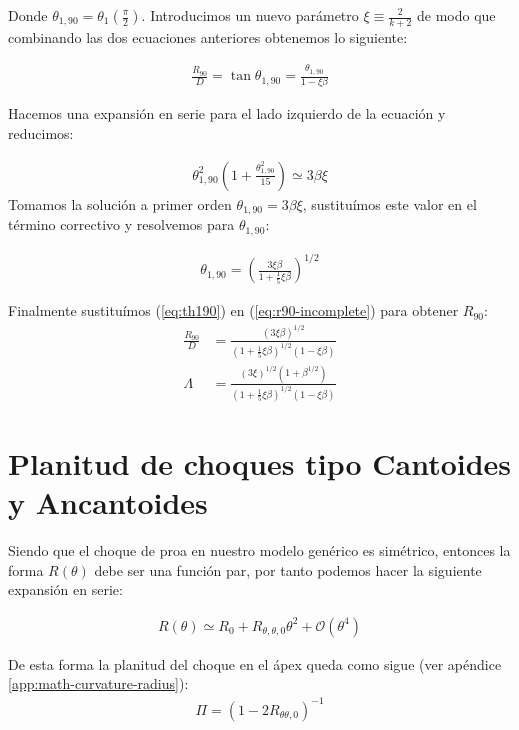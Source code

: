 Donde $\theta_{1,90} = \theta_1\left(\frac{\pi}{2}\right)$. Introducimos un nuevo parámetro $\xi \equiv \frac{2}{k+2}$ de modo que
combinando las dos ecuaciones anteriores obtenemos lo siguiente:

\begin{align}
  \frac{R_{90}}{D} = \tan\theta_{1,90} = \frac{\theta_{1,90}}{1-\xi\beta} \label{eq:r90-incomplete}
\end{align}

Hacemos una expansión en serie para el lado izquierdo de la ecuación y reducimos:

\begin{align}
  \theta^2_{1,90}\left(1 + \frac{\theta^2_{1,90}}{15}\right) \simeq 3\beta\xi
\end{align}
Tomamos la solución a primer orden $\theta_{1,90} = 3\beta\xi$,  sustituímos este valor en el término correctivo y resolvemos para
$\theta_{1,90}$:

\begin{align}
  \theta_{1,90} = \left(\frac{3\xi\beta}{1+\frac{1}{5}\xi\beta}\right)^{1/2} \label{eq:th190}
\end{align}

Finalmente sustituímos (\ref{eq:th190}) en (\ref{eq:r90-incomplete}) para obtener $R_{90}$:
\begin{align}
  \frac{R_{90}}{D} &= \frac{\left(3\xi\beta\right)^{1/2}}{\left(1+\frac{1}{5}\xi\beta\right)^{1/2}\left(1-\xi\beta\right)} \\
  \Lambda &= \frac{\left(3\xi\right)^{1/2}\left(1+\beta^{1/2}\right)}
                   {\left(1+\frac{1}{5}\xi\beta\right)^{1/2}\left(1-\xi\beta\right)} 
\end{align}

\section{Planitud de choques tipo Cantoides y Ancantoides}

Siendo que el choque de proa en nuestro modelo genérico es simétrico, entonces la forma $R(\theta)$ debe ser una función par,
por tanto podemos hacer la siguiente expansión en serie:

\begin{align}
  R(\theta) \simeq R_0 + R_{\theta, \theta, 0}\theta^2 + \mathcal{O}(\theta^4)
\end{align}

De esta forma la planitud del choque en el ápex queda como sigue (ver apéndice \ref{app:math-curvature-radius}):
\begin{align}
  \Pi = \left(1 - 2R_{\theta \theta, 0}\right)^{-1}
\end{align}

